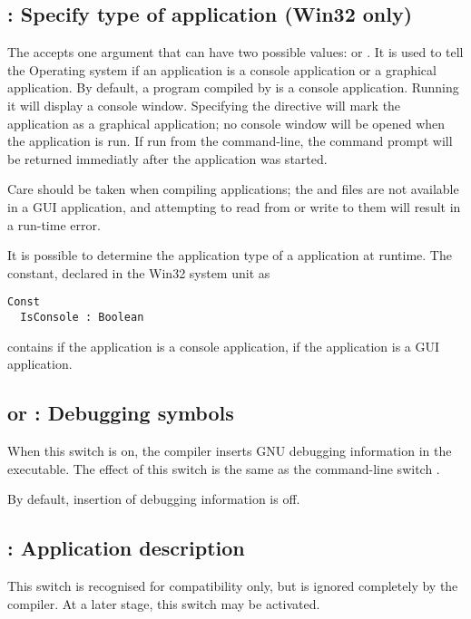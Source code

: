 \subsection{ : Specify type of application (Win32 only)}

The  accepts one argument that can have two possible
values:  or . It is used to tell the \windows
Operating system if an application is a console application or a graphical
application. By default, a program compiled by \fpc is a console
application. Running it will display a console window. Specifying the
 directive will mark the application as a graphical
application; no console window will be opened when the application is run.
If run from the command-line, the command prompt will be returned immediatly
after the application was started.

Care should be taken when compiling  applications; the 
and  files are not available in a GUI application, and
attempting to read from or write to them will result in a run-time error.

It is possible to determine the application type of a \windows application
at runtime. The  constant, declared in the Win32 system unit
as
\begin{verbatim}
Const
  IsConsole : Boolean
\end{verbatim}
contains  if the application is a console application, 
if the application is a GUI application.

\subsection{ or  : Debugging symbols}

When this switch is on,
the compiler inserts GNU debugging information in
the executable. The effect of this switch is the same as the command-line
switch .

By default, insertion of debugging information is off.

\subsection{ : Application description}

This switch is recognised for compatibility only, but is ignored completely
by the compiler. At a later stage, this switch may be activated.

